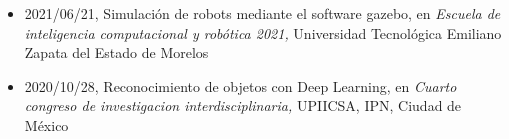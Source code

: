 \begin{itemize} 
\item 2021/06/21, Simulación de robots mediante el software gazebo, en \textit{ Escuela de inteligencia computacional y robótica 2021,} Universidad Tecnológica Emiliano Zapata del Estado de Morelos 
\item 2020/10/28, Reconocimiento de objetos con Deep Learning, en \textit{ Cuarto congreso de investigacion interdisciplinaria,} UPIICSA, IPN, Ciudad de México 
\end{itemize} 
